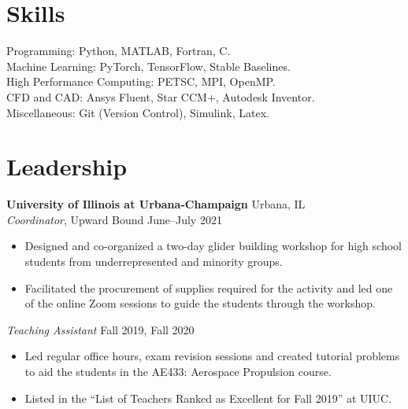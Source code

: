 \documentclass[margin]{res}
\begin{document}
\begin{resume}

\section{\large Skills}		 
Programming: Python, MATLAB, Fortran, C.\\
Machine Learning: PyTorch, TensorFlow, Stable Baselines.\\
High Performance Computing: PETSC, MPI, OpenMP.\\
CFD and CAD: Ansys Fluent, Star CCM+, Autodesk Inventor.\\ 
Miscellaneous: Git (Version Control), Simulink, Latex.

\section{\large Leadership}
{\bf University of Illinois at Urbana-Champaign} \hfill Urbana, IL\\
{\it Coordinator}, Upward Bound \hfill June--July 2021
\begin{itemize}
	\item Designed and co-organized a two-day glider building workshop for high school students from underrepresented and minority groups.
	\item Facilitated the procurement of supplies required for the activity and led one of the online Zoom sessions to guide the students through the workshop.
\end{itemize}

{\it Teaching Assistant} \hfill Fall 2019, Fall 2020
\begin{itemize}
	\item Led regular office hours, exam revision sessions and created tutorial problems to aid the students in the AE433: Aerospace Propulsion course.
	\item Listed in the ``List of Teachers Ranked as Excellent for Fall 2019'' at UIUC.
\end{itemize}



\end{resume}
\end{document}
